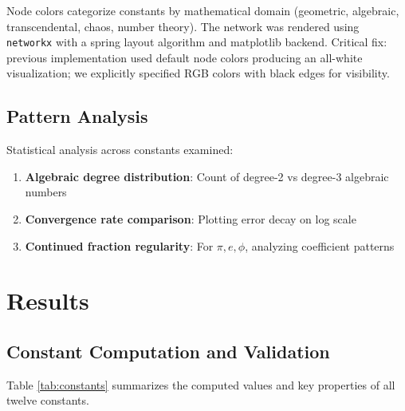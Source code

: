 \documentclass[11pt,a4paper]{article}
\begin{document}
Node colors categorize constants by mathematical domain (geometric, algebraic, transcendental, chaos, number theory). The network was rendered using \texttt{networkx} with a spring layout algorithm and matplotlib backend. Critical fix: previous implementation used default node colors producing an all-white visualization; we explicitly specified RGB colors with black edges for visibility.

\subsection{Pattern Analysis}

Statistical analysis across constants examined:
\begin{enumerate}
    \item \textbf{Algebraic degree distribution}: Count of degree-2 vs degree-3 algebraic numbers
    \item \textbf{Convergence rate comparison}: Plotting error decay on log scale
    \item \textbf{Continued fraction regularity}: For $\pi, e, \phi$, analyzing coefficient patterns
\end{enumerate}

\section{Results}

\subsection{Constant Computation and Validation}

Table \ref{tab:constants} summarizes the computed values and key properties of all twelve constants.
\end{document}
